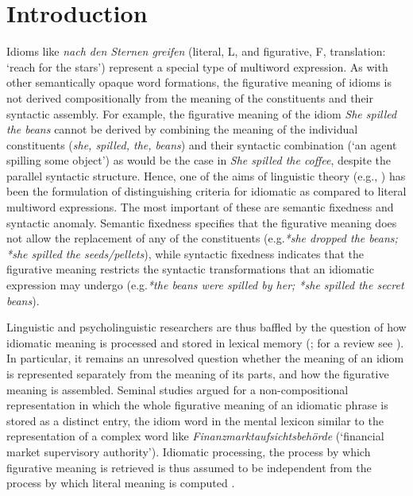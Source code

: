 \documentclass[output=paper]{langsci/langscibook}
\author{Eva Smolka\affiliation{University of Konstanz, Germany}\lastand Carsten Eulitz\affiliation{University of Konstanz, Germany}}
\begin{document}
\maketitle

\section{Introduction}\largerpage
Idioms like \textit{nach den Sternen greifen} (literal, L, and figurative, F, translation: ‘reach for the stars’) represent a special type of multiword expression. As with other semantically opaque word formations, the figurative meaning of idioms is not derived compositionally from the meaning of the constituents and their syntactic assembly. For example, the figurative meaning of the idiom \textit{She spilled the beans} cannot be derived by combining the meaning of the individual constituents (\textit{she, spilled, the, beans}) and their syntactic combination (‘an agent spilling some object’) as would be the case in \textit{She spilled the coffee}, despite the parallel syntactic structure. Hence, one of the aims of linguistic theory (e.g., \citealt{grice:1975,grice:1978}) has been the formulation of distinguishing criteria for idiomatic as compared to literal multiword expressions. The most important of these are semantic fixedness and syntactic anomaly. Semantic fixedness specifies that the figurative meaning does not allow the replacement of any of the constituents (e.g.\textit{*she dropped the beans; *she spilled the seeds/pellets}), while syntactic fixedness indicates that the figurative meaning restricts the syntactic transformations that an idiomatic expression may undergo (e.g.\textit{*the beans were spilled by her; *she spilled the secret beans}).


Linguistic and psycholinguistic researchers are thus baffled by the question of how idiomatic meaning is processed and stored in lexical memory (\citealt{burger:2003,burger:2004,cacciari:1994,gibbs:1994,gibbs:2002,swinney:1979}; for a review see \citealt{titone:1999,titone:2014}). In particular, it remains an unresolved question whether the meaning of an idiom is represented separately from the meaning of its parts, and how the figurative meaning is assembled. Seminal studies argued for a non-compositional representation in which the whole figurative meaning of an idiomatic phrase is stored as a distinct entry, the idiom word in the mental lexicon similar to the representation of a complex word like \textit{Finanzmarktaufsichtsbehörde} (‘financial market supervisory authority’). Idiomatic processing, the process by which figurative meaning is retrieved is thus assumed to be independent from the process by which \mbox{literal} meaning is computed \mbox{\citep{bobrow:1973,gibbs:1980,swinney:1979}.}
\end{document}
